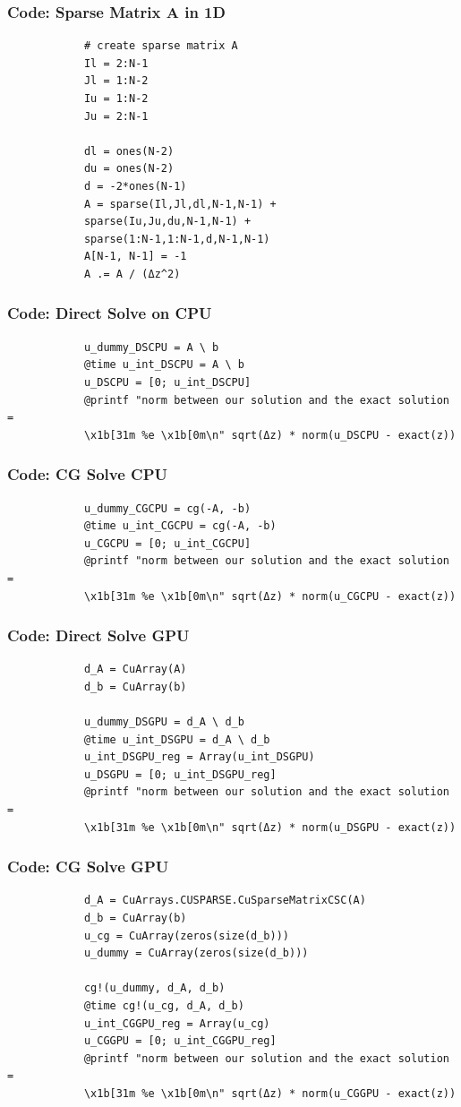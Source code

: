 \documentclass[aspectratio=169]{beamer}
\begin{document}
	\begin{frame}[fragile]
		\frametitle{Code: Sparse Matrix A in 1D}
		\begin{verbatim}
			# create sparse matrix A
			Il = 2:N-1
			Jl = 1:N-2
			Iu = 1:N-2
			Ju = 2:N-1
			
			dl = ones(N-2)
			du = ones(N-2)
			d = -2*ones(N-1)
			A = sparse(Il,Jl,dl,N-1,N-1) + 
			sparse(Iu,Ju,du,N-1,N-1) + 
			sparse(1:N-1,1:N-1,d,N-1,N-1)
			A[N-1, N-1] = -1
			A .= A / (Δz^2)
		\end{verbatim}
	\end{frame}
	
	\begin{frame}[fragile]
		\frametitle{Code: Direct Solve on CPU}
		\begin{verbatim}
			u_dummy_DSCPU = A \ b
			@time u_int_DSCPU = A \ b
			u_DSCPU = [0; u_int_DSCPU]
			@printf "norm between our solution and the exact solution = 
			\x1b[31m %e \x1b[0m\n" sqrt(Δz) * norm(u_DSCPU - exact(z))
		\end{verbatim}
	\end{frame}
	
	\begin{frame}[fragile]
		\frametitle{Code: CG Solve CPU}
		\begin{verbatim}
			u_dummy_CGCPU = cg(-A, -b)
			@time u_int_CGCPU = cg(-A, -b)
			u_CGCPU = [0; u_int_CGCPU]
			@printf "norm between our solution and the exact solution = 
			\x1b[31m %e \x1b[0m\n" sqrt(Δz) * norm(u_CGCPU - exact(z))
		\end{verbatim}
	\end{frame}
	
	\begin{frame}[fragile]
		\frametitle{Code: Direct Solve GPU}
		\begin{verbatim}
			d_A = CuArray(A)
			d_b = CuArray(b)
			
			u_dummy_DSGPU = d_A \ d_b
			@time u_int_DSGPU = d_A \ d_b
			u_int_DSGPU_reg = Array(u_int_DSGPU)
			u_DSGPU = [0; u_int_DSGPU_reg]
			@printf "norm between our solution and the exact solution = 
			\x1b[31m %e \x1b[0m\n" sqrt(Δz) * norm(u_DSGPU - exact(z))
		\end{verbatim}
	\end{frame}
	
	\begin{frame}[fragile]
		\frametitle{Code: CG Solve GPU}
		\begin{verbatim}
			d_A = CuArrays.CUSPARSE.CuSparseMatrixCSC(A)
			d_b = CuArray(b)
			u_cg = CuArray(zeros(size(d_b)))
			u_dummy = CuArray(zeros(size(d_b)))
			
			cg!(u_dummy, d_A, d_b)
			@time cg!(u_cg, d_A, d_b)
			u_int_CGGPU_reg = Array(u_cg)
			u_CGGPU = [0; u_int_CGGPU_reg]
			@printf "norm between our solution and the exact solution = 
			\x1b[31m %e \x1b[0m\n" sqrt(Δz) * norm(u_CGGPU - exact(z))
		\end{verbatim}
	\end{frame}
	
\end{document}
